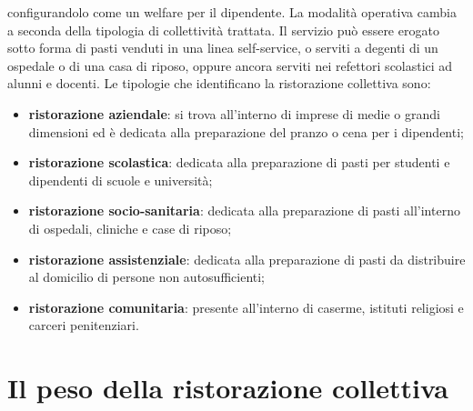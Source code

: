 \documentclass[a4paper, titlepage, 12pt, openright, twoside]{book}
\begin{document}
\begin{itemize}
											configurandolo come un welfare per il dipendente. La modalità operativa cambia a seconda della tipologia di collettività trattata.
											Il servizio può essere erogato sotto forma di pasti venduti in una linea self-service, o serviti a degenti di un ospedale o di una
											casa di riposo, oppure ancora serviti nei refettori scolastici ad alunni e docenti.
											Le tipologie che identificano la ristorazione collettiva sono:
											\begin{itemize}
												\item \textbf{ristorazione aziendale}: si trova all'interno di imprese di medie o grandi dimensioni ed è dedicata alla preparazione
																						del pranzo o cena per i dipendenti;
												\item \textbf{ristorazione scolastica}: dedicata alla preparazione di pasti per studenti e dipendenti di scuole e università;
												\item \textbf{ristorazione socio-sanitaria}: dedicata alla preparazione di pasti all'interno di ospedali, cliniche e case di riposo;
												\item \textbf{ristorazione assistenziale}: dedicata alla preparazione di pasti da distribuire al domicilio di persone 
																							non autosufficienti;
												\item \textbf{ristorazione comunitaria}: presente all'interno di caserme, istituti religiosi e carceri penitenziari.
											\end{itemize}
\end{itemize}

\section{Il peso della ristorazione collettiva}
\end{document}
